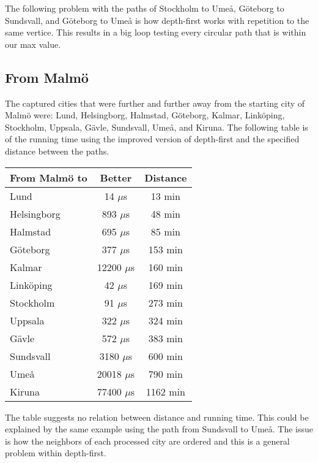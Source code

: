 \documentclass[a4paper,11pt]{article}
\begin{document}
        The following problem with the paths of Stockholm to Umeå, Göteborg to Sundsvall, and Göteborg to Umeå is how depth-first works with repetition to the same vertice. This results in a big loop testing every circular path that is within our max value. 

    \subsection*{From Malmö}

        The captured cities that were further and further away from the starting city of Malmö were: Lund, Helsingborg, Halmstad, Göteborg, Kalmar, Linköping, Stockholm, Uppsala, Gävle, Sundsvall, Umeå, and Kiruna. The following table is of the running time using the improved version of depth-first and the specified distance between the paths.
        \begin{table}[h]
        \begin{center}
        \begin{tabular}{l|c|c}
        \textbf{From Malmö to} & \textbf{Better} & \textbf{Distance} \\
        \hline
        Lund        & 14 $\mu$s    & 13 min\\
        Helsingborg & 893 $\mu$s   & 48 min\\
        Halmstad    & 695 $\mu$s   & 85 min\\
        Göteborg    & 377 $\mu$s   & 153 min\\
        Kalmar      & 12200 $\mu$s & 160 min\\
        Linköping   & 42 $\mu$s    & 169 min\\
        Stockholm   & 91 $\mu$s    & 273 min\\
        Uppsala     & 322 $\mu$s   & 324 min\\
        Gävle       & 572 $\mu$s   & 383 min\\
        Sundsvall   & 3180 $\mu$s  & 600 min\\
        Umeå        & 20018 $\mu$s & 790 min\\
        Kiruna      & 77400 $\mu$s & 1162 min\\
        \end{tabular}
        \end{center}
        \end{table}
        The table suggests no relation between distance and running time. This could be explained by the same example using the path from Sundsvall to Umeå. The issue is how the neighbors of each processed city are ordered and this is a general problem within depth-first.
\end{document}
